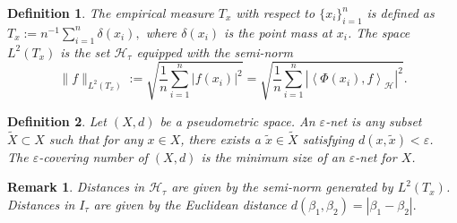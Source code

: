 \documentclass[twoside, onecolumn]{article}
\def\Hcal{\mathcal{H}}
\def\Hcal{\mathcal{H}}
\newtheorem{definition}{Definition}
\newtheorem{assumption}{Assumption}
\newtheorem{remark}{Remark}
\begin{document}
\begin{definition} 
The \emph{empirical measure} $T_x$ with respect to  $\{x_i\}_{i=1}^{n}$ is defined as $T_{x}:=n^{-1}\sum_{i=1}^{n} \delta(x_i),$ where $\delta(x_i)$ is the point mass at $x_i$. The space $L^{2}(T_{x})$ is the set $\mathcal{H}_{\tau}$ equipped with the semi-norm
\[
\|f \|_{L^2(T_{x})}:=\sqrt{\frac{1}{n}\sum_{i=1}^{n} |f(x_i)|^{2}}=\sqrt{\frac{1}{n}\sum_{i=1}^{n}|\left<\Phi(x_i),f\right>_\Hcal|^{2}}.
\]
\end{definition}

\begin{definition}
Let $(X,d)$ be a pseudometric space. An $\varepsilon$-net is any subset $\widetilde{X}\subset X$ such that for any $x\in X$, there exists a $\widetilde{x}\in \widetilde{X}$ satisfying $d(x,\widetilde{x})<\varepsilon$. The $\varepsilon$-\emph{covering number} of $(X,d)$ is the minimum size of an $\varepsilon$-net for $X$.
\end{definition}

\begin{remark}
Distances in $\mathcal{H}_\tau$ are given by the semi-norm generated by $L^2(T_x)$. Distances in $I_\tau$ are given by the Euclidean distance $d(\beta_1, \beta_2)=|\beta_1-\beta_2|.$
\end{remark}





\end{document}

